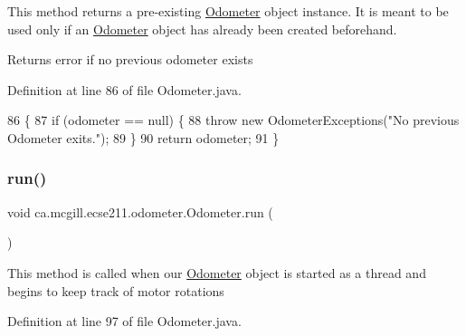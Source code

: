 This method returns a pre-\/existing \hyperlink{classca_1_1mcgill_1_1ecse211_1_1odometer_1_1_odometer}{Odometer} object instance. It is meant to be used only if an \hyperlink{classca_1_1mcgill_1_1ecse211_1_1odometer_1_1_odometer}{Odometer} object has already been created beforehand.

\begin{DoxyReturn}{Returns}
error if no previous odometer exists 
\end{DoxyReturn}


Definition at line 86 of file Odometer.\+java.


\begin{DoxyCode}
86                                                                               \{
87     \textcolor{keywordflow}{if} (odometer == null) \{
88       \textcolor{keywordflow}{throw} \textcolor{keyword}{new} OdometerExceptions(\textcolor{stringliteral}{"No previous Odometer exits."});
89     \}
90     \textcolor{keywordflow}{return} odometer;
91   \}
\end{DoxyCode}
\mbox{\label{classca_1_1mcgill_1_1ecse211_1_1odometer_1_1_odometer_af0ff4c5121973a8310cf986e25fa0d87}} 
\subsubsection{\texorpdfstring{run()}{run()}}
{\footnotesize\ttfamily void ca.\+mcgill.\+ecse211.\+odometer.\+Odometer.\+run (\begin{DoxyParamCaption}{ }\end{DoxyParamCaption})}

This method is called when our \hyperlink{classca_1_1mcgill_1_1ecse211_1_1odometer_1_1_odometer}{Odometer} object is started as a thread and begins to keep track of motor rotations 

Definition at line 97 of file Odometer.\+java.


